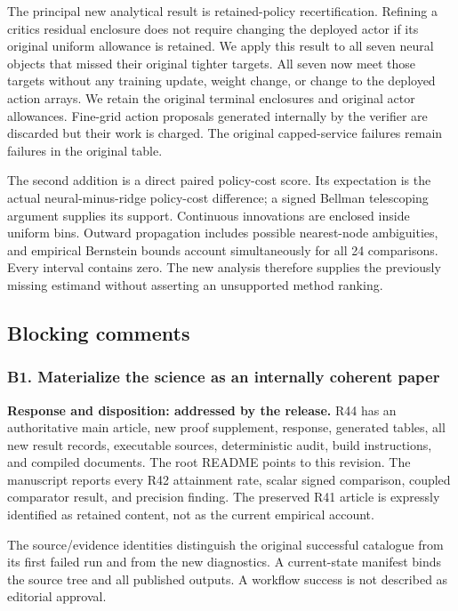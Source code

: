 \documentclass[ecta,nameyear,draft]{econsocart}
\begin{document}
The principal new analytical result is retained-policy recertification.
Refining a critic\textquotesingle s residual enclosure does not require
changing the deployed actor if its original uniform allowance is
retained. We apply this result to all seven neural objects that missed
their original tighter targets. All seven now meet those targets without
any training update, weight change, or change to the deployed action
arrays. We retain the original terminal enclosures and original actor
allowances. Fine-grid action proposals generated internally by the
verifier are discarded but their work is charged. The original
capped-service failures remain failures in the original table.

The second addition is a direct paired policy-cost score. Its
expectation is the actual neural-minus-ridge policy-cost difference; a
signed Bellman telescoping argument supplies its support. Continuous
innovations are enclosed inside uniform bins. Outward propagation
includes possible nearest-node ambiguities, and empirical Bernstein
bounds account simultaneously for all 24 comparisons. Every interval
contains zero. The new analysis therefore supplies the previously
missing estimand without asserting an unsupported method ranking.

\hypertarget{blocking-comments}{%
\subsection{Blocking comments}\label{blocking-comments}}

\hypertarget{b1-materialize-the-science-as-an-internally-coherent-paper}{%
\subsubsection{B1. Materialize the science as an internally coherent
paper}\label{b1-materialize-the-science-as-an-internally-coherent-paper}}

\textbf{Response and disposition: addressed by the release.} R44 has an
authoritative main article, new proof supplement, response, generated
tables, all new result records, executable sources, deterministic audit,
build instructions, and compiled documents. The root README points to
this revision. The manuscript reports every R42 attainment rate, scalar
signed comparison, coupled comparator result, and precision finding. The
preserved R41 article is expressly identified as retained content, not
as the current empirical account.

The source/evidence identities distinguish the original successful
catalogue from its first failed run and from the new diagnostics. A
current-state manifest binds the source tree and all published outputs.
A workflow success is not described as editorial approval.
\end{document}
